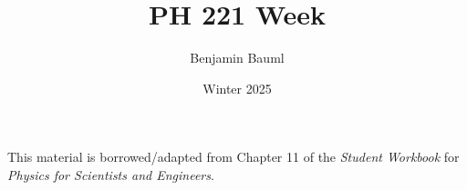 \documentclass[]{article}
\title{PH 221 Week \Week}
\author{Benjamin Bauml}
\date{Winter 2025}
\newcommand{\FileDepth}{../../..}
\begin{document}
\maketitle
\begin{center}
	This material is borrowed/adapted from Chapter 11 of the \textit{Student Workbook} for \textit{Physics for Scientists and Engineers}.
\end{center}



\end{document}
